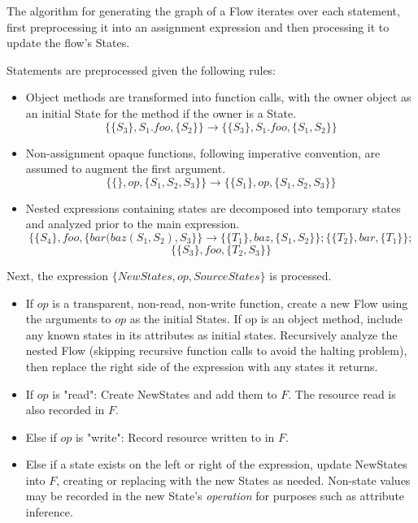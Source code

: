 \documentclass{llncs}
\newcommand{\+}{\discretionary{\mbox{${\bm\cdot}\mkern-1mu$}}{}{}}
\begin{document}
The algorithm for generating the graph of a Flow iterates over each statement, first preprocessing it
into an assignment expression and then processing it to update the flow's States.

Statements are preprocessed given the following rules:
\begin{itemize}
    \item Object methods are transformed into function calls, with the owner object as an initial
    State for the method if the owner is a State. 
        \[\{\{S_3\}, S_1.foo, \{S_2\}\} \to \{\{S_3\}, S_1.foo, \{S_1, S_2\}\}\]
    \item Non-assignment opaque functions, following imperative convention, are assumed to augment the first argument.
        \[\{\{\}, op, \{S_1, S_2, S_3\}\} \to \{\{S_1\}, op, \{S_1, S_2, S_3\}\}\]
    \item Nested expressions containing states are decomposed into temporary states and analyzed prior to the main expression.
        $$\{\{S_4\}, foo, \{bar(baz(S_1, S_2), S_3\}\} \to 
        \{\{T_1\}, baz, \{S_1, S_2\}\};   \{\{T_2\}, bar, \{T_1\}\};$$
        $$\{\{S_3\}, foo, \{T_2, S_3\}\}$$
\end{itemize}
Next, the expression $\{NewStates, op, SourceStates\}$ is processed.


\begin{itemize}
    \item If $op$ is a transparent, non-read, non-write function, create a new Flow using the arguments
    to $op$ as the initial States. If op is an object method, include any known states in its attributes as initial states. Recursively analyze the nested Flow (skipping recursive function calls to avoid the halting problem), then replace the right side of the expression with any states it returns.
    \item If $op$ is "read": Create NewStates and add them to $F$. The resource read is also recorded in $F$.
    \item Else if $op$ is "write": Record resource written to in $F$.
    \item Else if a state exists on the left or right of the expression, update NewStates into $F$, creating or replacing with the new States as needed. Non-state values may be recorded in the new State's \textit{operation} for purposes such as attribute inference.
\end{itemize}
\end{document}
